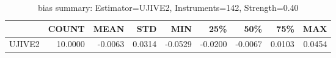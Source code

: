 \begin{table}[ht]
\centering
\caption{bias summary: Estimator=UJIVE2, Instruments=142, Strength=0.40}
\begin{tabular}{lrrrrrrrr}
\toprule
 & COUNT & MEAN & STD & MIN & 25\% & 50\% & 75\% & MAX \\
\midrule
UJIVE2 & 10.0000 & -0.0063 & 0.0314 & -0.0529 & -0.0200 & -0.0067 & 0.0103 & 0.0454 \\
\bottomrule
\end{tabular}
\end{table}
